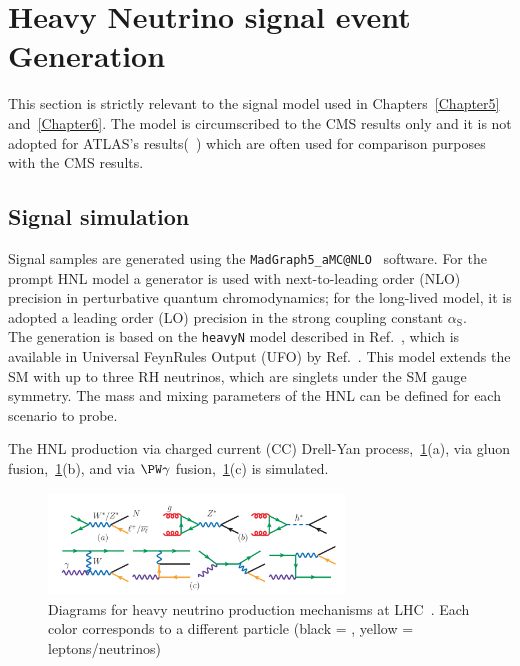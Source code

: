 \clearpage
\section{Heavy Neutrino signal event Generation}\label{sec:c4hnl}
This section is strictly relevant to the signal model used in
Chapters~\ref{Chapter5} and~\ref{Chapter6}. The model is circumscribed to the
CMS results only and it is not adopted for ATLAS's
results(~\cite{atlasintro2}) which are often used for comparison
purposes with the CMS results.



\subsection{Signal simulation}\label{sec:c4hnlmodel}

Signal samples are generated using the
\texttt{MadGraph5\_aMC@NLO}~\cite{Alwall_2014} software. 
For the prompt HNL
model a generator is used with next-to-leading order (NLO) precision
in perturbative quantum chromodynamics; for the long-lived model, it
is adopted a leading order (LO) precision in the strong
coupling constant $\alpha_{\mathrm{S}}$.\\
The generation is based on the \texttt{heavyN} model described in
Ref.~\cite{Atre:2009rg}, which is available in Universal FeynRules
Output (UFO) by Ref.~\cite{Alva:2014gxa,Degrande_2016,heavyN}.
This model extends the SM with up to three RH neutrinos,
which are singlets under the SM gauge symmetry.
The mass and mixing parameters of the HNL can be defined for each
scenario to probe.

The HNL production via charged current (CC) Drell-Yan
process,~\ref{fid:hnl_production}(a), via gluon
fusion,~\ref{fid:hnl_production}(b), and via $\PW \gamma$
fusion,~\ref{fid:hnl_production}(c) is simulated. 
\begin{figure}[h!]
\centering
 \includegraphics[clip,trim=0cm 0cm 0cm 1cm, width=0.70\textwidth]{Figures/c4/hnl_production}
  \caption{Diagrams for heavy neutrino production mechanisms at
    LHC~\cite{Pascoli_2019}. Each color corresponds to a different
    particle (black = \hnl, yellow = leptons/neutrinos)}
  \label{fid:hnl_production}
\end{figure}

